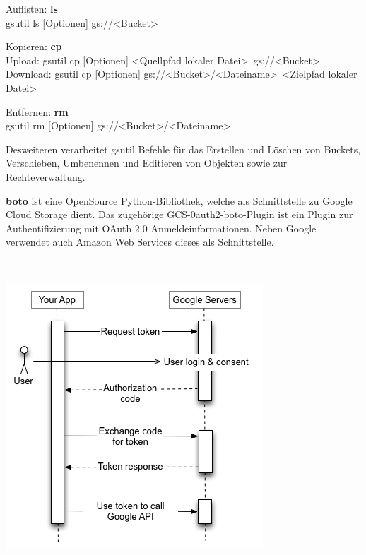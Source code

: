 \documentclass[12pt,a4paper,bibliography=totocnumbered,listof=totocnumbered]{scrartcl}
\begin{document}
\begin{compactitem}
	\item Auflisten: \textbf{ls}\\
	gsutil ls [Optionen] gs://\textless Bucket\textgreater
	\item Kopieren: \textbf{cp}\\
	Upload: gsutil cp [Optionen] \textless Quellpfad lokaler Datei\textgreater~gs://\textless Bucket\textgreater\\
	Download:  gsutil cp [Optionen] gs://\textless Bucket\textgreater/\textless Dateiname\textgreater~\textless Zielpfad lokaler Datei\textgreater
	\item Entfernen: \textbf{rm}\\
	gsutil rm [Optionen] gs://\textless Bucket\textgreater /\textless Dateiname\textgreater
\end{compactitem}

Desweiteren verarbeitet gsutil Befehle für das Erstellen und Löschen von Buckets, Verschieben, Umbenennen und Editieren von Objekten sowie zur Rechteverwaltung.

\textbf{boto} \cite{47} ist eine OpenSource Python-Bibliothek, welche als Schnittstelle zu Google Cloud Storage dient. Das zugehörige GCS-0auth2-boto-Plugin ist ein Plugin zur Authentifizierung mit OAuth 2.0 Anmeldeinformationen. Neben Google verwendet auch Amazon Web Services dieses als Schnittstelle.

\vspace{1em}
$\;$\\
\begin{minipage}{\linewidth}
	\centering
	\includegraphics[width=0.7\linewidth]{OAuth.png}
	\label{OAuthV}
\end{minipage}
\vspace{1em}
\end{document}
